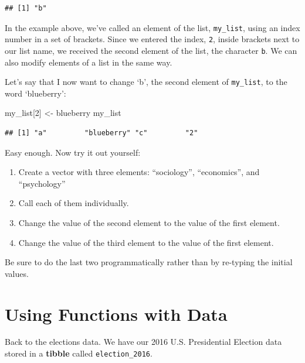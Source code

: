 \documentclass[
]{book}
\newenvironment{Shaded}{\begin{snugshade}}{\end{snugshade}}
\newcommand{\DecValTok}[1]{\textcolor[rgb]{0.00,0.00,0.81}{#1}}
\newcommand{\NormalTok}[1]{#1}
\newcommand{\OtherTok}[1]{\textcolor[rgb]{0.56,0.35,0.01}{#1}}
\newcommand{\StringTok}[1]{\textcolor[rgb]{0.31,0.60,0.02}{#1}}
\providecommand{\tightlist}{%
  \setlength{\itemsep}{0pt}\setlength{\parskip}{0pt}}
\begin{document}
\begin{verbatim}
## [1] "b"
\end{verbatim}

In the example above, we've called an element of the list, \texttt{my\_list}, using an index number in a set of brackets. Since we entered the index, \texttt{2}, inside brackets next to our list name, we received the second element of the list, the character \texttt{b}. We can also modify elements of a list in the same way.

Let's say that I now want to change `b', the second element of \texttt{my\_list}, to the word `blueberry':

\begin{Shaded}
\begin{Highlighting}[]
\NormalTok{my\_list[}\DecValTok{2}\NormalTok{] }\OtherTok{\textless{}{-}} \StringTok{\textquotesingle{}blueberry\textquotesingle{}}
\NormalTok{my\_list}
\end{Highlighting}
\end{Shaded}

\begin{verbatim}
## [1] "a"         "blueberry" "c"         "2"
\end{verbatim}

Easy enough. Now try it out yourself:

\begin{enumerate}
\def\labelenumi{\arabic{enumi}.}
\tightlist
\item
  Create a vector with three elements: ``sociology'', ``economics'', and ``psychology''
\item
  Call each of them individually.
\item
  Change the value of the second element to the value of the first element.
\item
  Change the value of the third element to the value of the first element.
\end{enumerate}

Be sure to do the last two programmatically rather than by re-typing the initial values.

\hypertarget{using-functions-with-data}{%
\section{Using Functions with Data}\label{using-functions-with-data}}

Back to the elections data. We have our 2016 U.S. Presidential Election data stored in a \textbf{tibble} called \texttt{election\_2016}.
\end{document}
